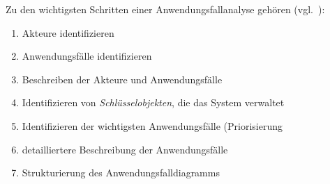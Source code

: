 \begin{tcolorbox}
    Zu den wichtigsten Schritten einer Anwendungsfallanalyse gehören (vgl.~\cite[Aufgabe 5.2, 88]{Buh09}):
    \begin{enumerate}
        \item Akteure identifizieren
        \item Anwendungsfälle identifizieren
        \item Beschreiben der Akteure und Anwendungsfälle
        \item Identifizieren von \textit{Schlüsselobjekten}, die das System verwaltet
        \item Identifizieren der wichtigsten Anwendungsfälle (Priorisierung
        \item detailliertere Beschreibung der Anwendungsfälle
        \item Strukturierung des Anwendungsfalldiagramms
    \end{enumerate}
\end{tcolorbox}
